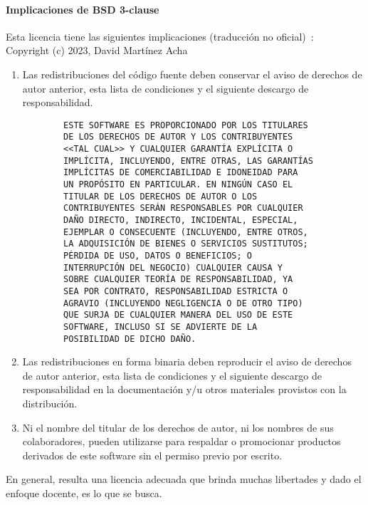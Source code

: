 \paragraph{Implicaciones de BSD 3-clause} Esta licencia tiene las siguientes implicaciones
(traducción no oficial)~\cite{bsd}:\\

    Copyright (c) 2023, David Martínez Acha
\begin{enumerate}
    \item Las redistribuciones del código fuente deben conservar el aviso de
    derechos de autor anterior, esta lista de condiciones y el siguiente
    descargo de responsabilidad.
    \begin{verbatim}
        ESTE SOFTWARE ES PROPORCIONADO POR LOS TITULARES 
        DE LOS DERECHOS DE AUTOR Y LOS CONTRIBUYENTES 
        <<TAL CUAL>> Y CUALQUIER GARANTÍA EXPLÍCITA O
        IMPLÍCITA, INCLUYENDO, ENTRE OTRAS, LAS GARANTÍAS
        IMPLÍCITAS DE COMERCIABILIDAD E IDONEIDAD PARA 
        UN PROPÓSITO EN PARTICULAR. EN NINGÚN CASO EL 
        TITULAR DE LOS DERECHOS DE AUTOR O LOS 
        CONTRIBUYENTES SERÁN RESPONSABLES POR CUALQUIER 
        DAÑO DIRECTO, INDIRECTO, INCIDENTAL, ESPECIAL, 
        EJEMPLAR O CONSECUENTE (INCLUYENDO, ENTRE OTROS, 
        LA ADQUISICIÓN DE BIENES O SERVICIOS SUSTITUTOS;
        PÉRDIDA DE USO, DATOS O BENEFICIOS; O 
        INTERRUPCIÓN DEL NEGOCIO) CUALQUIER CAUSA Y 
        SOBRE CUALQUIER TEORÍA DE RESPONSABILIDAD, YA 
        SEA POR CONTRATO, RESPONSABILIDAD ESTRICTA O 
        AGRAVIO (INCLUYENDO NEGLIGENCIA O DE OTRO TIPO)
        QUE SURJA DE CUALQUIER MANERA DEL USO DE ESTE 
        SOFTWARE, INCLUSO SI SE ADVIERTE DE LA 
        POSIBILIDAD DE DICHO DAÑO.
    \end{verbatim}
    \item Las redistribuciones en forma binaria deben reproducir el aviso de
    derechos de autor anterior, esta lista de condiciones y el siguiente
    descargo de responsabilidad en la documentación y/u otros materiales
    provistos con la distribución.
    \item Ni el nombre del titular de los derechos de autor, ni los nombres de
    sus colaboradores, pueden utilizarse para respaldar o promocionar productos
    derivados de este software sin el permiso previo por escrito.
\end{enumerate}

En general, resulta una licencia adecuada que brinda muchas libertades y dado el
enfoque docente, es lo que se busca.